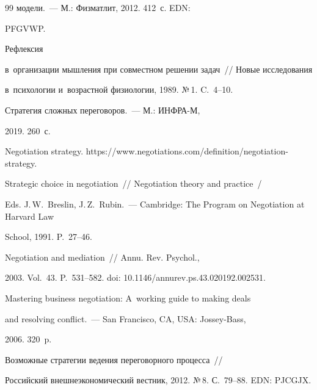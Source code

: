 {{\begin{thebibliography}{99}
модели.~--- М.: Физматлит, 2012. 412~с. EDN: 


PFGVWP.


  




   Рефлексия 


в~организации мышления при совместном решении задач~/\!\!/ Новые исследования 


в~психологии и~возрастной физиологии, 1989. №\,1. C.~4--10.




   Стратегия сложных переговоров.~--- М.: ИНФРА-М, 


2019. 260~с.




  Negotiation strategy. {\sf https://www.negotiations.com/definition/negotiation-strategy}. 




   Strategic choice in negotiation~/\!\!/ Negotiation theory and practice~/


  Eds. J.\,W.~Breslin, J.\,Z.~Rubin.~--- Cambridge: The Program on Negotiation at Harvard Law 


School, 1991. P.~27--46.




   Negotiation and mediation~/\!\!/ Annu. Rev. Psychol., 


2003. Vol.~43. P.~531--582. doi: 10.1146\!/\!annurev.ps.43.020192.002531.


  




   Mastering business negotiation: A~working guide to making deals 


and resolving conflict.~--- San Francisco, CA, USA: Jossey-Bass,


2006. 320~p. 




   Возможные стратегии ведения переговорного процесса~/\!\!/ 


Российский внешнеэкономический вестник, 2012. №\,8. С.~79--88. EDN: PJCGJX.


  



\end{thebibliography}}}

